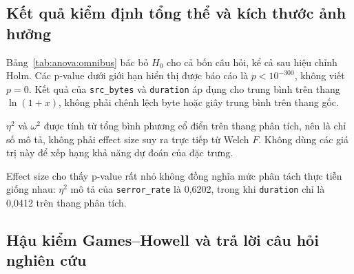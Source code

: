 \subsection{Kết quả kiểm định tổng thể và kích thước ảnh hưởng}

Bảng~\ref{tab:anova:omnibus} bác bỏ $H_0$ cho cả bốn câu hỏi, kể cả sau hiệu chỉnh Holm.
Các p-value dưới giới hạn hiển thị được báo cáo là $p<10^{-300}$, không viết $p=0$.
Kết quả của \texttt{src\_bytes} và \texttt{duration} áp dụng cho trung bình trên thang
$\ln(1+x)$, không phải chênh lệch byte hoặc giây trung bình trên thang gốc.

\begin{table}[H]
\centering
\caption{Kết quả Welch ANOVA cho bốn câu hỏi nghiên cứu}
\label{tab:anova:omnibus}
\small
\setlength{\tabcolsep}{3.5pt}
\par\smallskip
\footnotesize $\eta^2$ và $\omega^2$ được tính từ tổng bình phương cổ điển trên thang
phân tích, nên là chỉ số mô tả, không phải effect size suy ra trực tiếp từ Welch $F$.
Không dùng các giá trị này để xếp hạng khả năng dự đoán của đặc trưng.
\end{table}

Effect size cho thấy p-value rất nhỏ không đồng nghĩa mức phân tách thực tiễn giống nhau:
$\eta^2$ mô tả của \texttt{serror\_rate} là 0,6202, trong khi \texttt{duration} chỉ là
0,0412 trên thang phân tích.

\subsection{Hậu kiểm Games--Howell và trả lời câu hỏi nghiên cứu}

